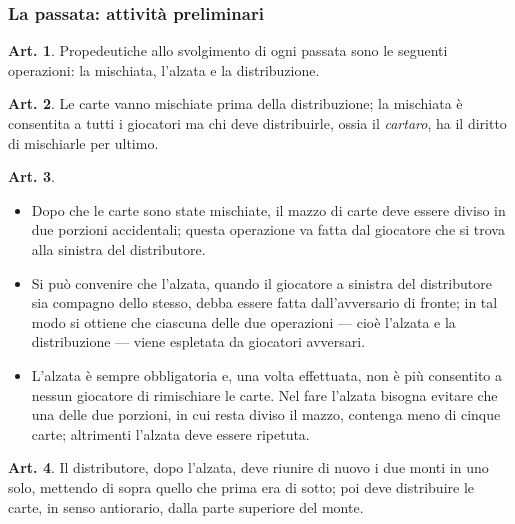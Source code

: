 \documentclass[italian,a4paper]{book}
\theoremstyle{definition}
\newtheorem{art}{Art.}
\newenvironment{packeditem}{
\begin{itemize}
  \setlength{\itemsep}{1pt}
  \setlength{\parskip}{0pt}
  \setlength{\parsep}{0pt}
}{\end{itemize}}
\begin{document}
\subsubsection{La passata: attività preliminari}
\begin{art}\label{passata.iniz}
    Propedeutiche allo svolgimento di ogni passata sono le seguenti operazioni: la mischiata, l'alzata e la distribuzione.
\end{art}
\begin{art}
    Le carte vanno mischiate prima della distribuzione; la mischiata è
    consentita a tutti i giocatori ma chi deve distribuirle, ossia il
    \emph{cartaro}, ha il diritto di mischiarle per ultimo.
\end{art}
\begin{art} \hspace*{\fill}
    \begin{packeditem}
\item Dopo che le carte sono state mischiate, il mazzo di carte deve essere diviso in due porzioni accidentali; questa operazione va fatta dal giocatore che si trova alla sinistra del distributore.
\item Si può convenire che l'alzata, quando il giocatore a sinistra del
    distributore sia compagno dello stesso, debba essere fatta
    dall'avversario di fronte; in tal modo si ottiene che ciascuna delle due
    operazioni --- cioè l'alzata e la distribuzione --- viene espletata da giocatori avversari.
\item L'alzata è sempre obbligatoria e, una volta effettuata, non è più consentito a nessun giocatore di rimischiare le carte. Nel fare l'alzata bisogna evitare che una delle due porzioni, in cui resta diviso il mazzo, contenga meno di cinque carte; altrimenti l'alzata deve essere ripetuta.
    \end{packeditem}
\end{art}
\begin{art}
    Il distributore, dopo l'alzata, deve riunire di nuovo i due monti in uno
    solo, mettendo di sopra quello che prima era di sotto; poi deve
    distribuire le carte, in senso antiorario, dalla parte superiore del monte.
\end{art}
\end{document}
